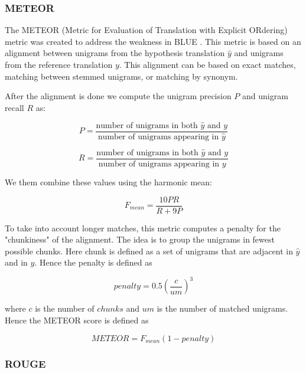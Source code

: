 \subsubsection{METEOR}



The METEOR (Metric for Evaluation of Translation with Explicit ORdering) metric was created to address the weakness in BLUE \cite{Lavie}. This metric is based on an alignment between unigrams from the hypothesis translation $\hat{y}$ and unigrams from the reference translation $y$. This alignment can be based on exact matches, matching between stemmed unigrams, or matching by synonym.

After the alignment is done we compute the unigram precision $P$ and unigram recall $R$ as:

\begin{equation*}
P = \frac{\text{number of } \text{unigrams in both } \hat{y} \text{ and } y}{\text{number of } \text{unigrams appearing in } \hat{y}}
\end{equation*}    


\begin{equation*}
R = \frac{\text{number of } \text{unigrams in both } \hat{y} \text{ and } y}{\text{number of } \text{unigrams appearing in } y}
\end{equation*}    

We them combine these values using the harmonic mean:

\begin{equation*}
F_{mean} = \frac{10 P R}{R + 9P}
\end{equation*}

To take into account longer matches, this metric computes a penalty for the "chunkiness" of the alignment. The idea is to group the unigrams in fewest possible chunks. Here chunk is defined as a set of unigrams that are adjacent in $\hat{y}$ and in $y$. Hence the penalty is defined as

\begin{equation*}
penalty = 0.5 \left( \frac{c}{um} \right)^{3}
\end{equation*}

where $c$ is the number of $chunks$ and $um$ is the number of matched unigrams. Hence the METEOR score is defined as

\begin{equation*}
METEOR = F_{mean} (1 - penalty)
\end{equation*}

\subsubsection{ROUGE}

